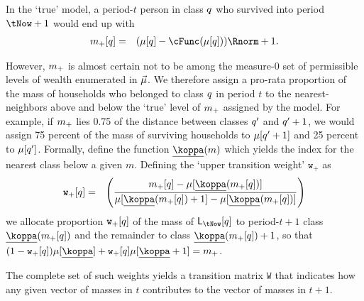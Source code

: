 \documentclass{handout}
\begin{document}
In the `true' model, a period-$t$ person in class $q$ who survived into period $\tNow+1$ 
would end up with
\begin{equation}\begin{gathered}\begin{aligned}
  \mqNext[\class] & = & (\mclass[\class]-\cFunc(\mclass[\class]))\Rnorm + 1
.
\end{aligned}\end{gathered}\end{equation}

\renewcommand{\weight}{\texttt{w}_{+}}
\newcommand{\Weight}{\texttt{W}}

However, $m_{+}$ is almost certain not to be among the measure-0 set of permissible levels of wealth
enumerated in $\vec{\mu}$.  We therefore assign a pro-rata proportion
of the mass of households who belonged to class $q$ in period $t$ to the nearest-neighbors
above and below the `true' level of $m_{+}$ assigned by the model.  For 
example, if $m_{+}$ lies 0.75 of the distance between classes $q'$ and $q'+1$,
we would assign 75 percent of the mass of surviving households to $\mu[q'+1]$ and 
25 percent to $\mu[q']$.  Formally, define the function $\uKoppa(m)$ which
yields the index for the nearest class below a given $m$.  Defining the `upper transition weight' 
$\weight$ as 
\begin{equation}\begin{gathered}\begin{aligned}
 \weight[\class] & = & \left(\frac{\mqNext[\class]-\mclass[\uKoppa(\mqNext[\class])]}{
\mclass[\uKoppa(\mqNext[\class])+1]-\mclass[\uKoppa(\mqNext[\class])]}\right)
\end{aligned}\end{gathered}\end{equation}
we allocate proportion $\weight[\class]$ of the mass of $\LMass_{\tNow}[\class]$ to 
period-$t+1$ class $\uKoppa(\mqNext[\class])$ and the remainder to class $\uKoppa(\mqNext[\class])+1$, so that $(1-\weight[q]) \mclass[\uKoppa]+\weight[q]\mclass[\uKoppa+1] = \mqNext$.

The complete set of such weights yields a transition matrix $\Weight$ that indicates how any
given vector of masses in $t$ contributes to the vector of masses in $t+1$.  
\end{document}
